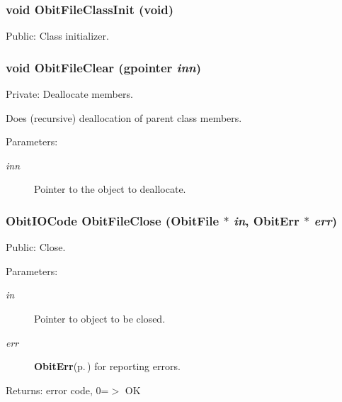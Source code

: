 \subsubsection{\setlength{\rightskip}{0pt plus 5cm}void Obit\-File\-Class\-Init (void)}\label{ObitFile_8c_a27}


Public: Class initializer. 

\subsubsection{\setlength{\rightskip}{0pt plus 5cm}void Obit\-File\-Clear (gpointer {\em inn})}\label{ObitFile_8c_a4}


Private: Deallocate members. 

Does (recursive) deallocation of parent class members. \begin{Desc}
\item[Parameters:]
\begin{description}
\item[{\em inn}]Pointer to the object to deallocate. \end{description}
\end{Desc}
\subsubsection{\setlength{\rightskip}{0pt plus 5cm}Obit\-IOCode Obit\-File\-Close ({\bf Obit\-File} $\ast$ {\em in}, {\bf Obit\-Err} $\ast$ {\em err})}\label{ObitFile_8c_a16}


Public: Close. 

\begin{Desc}
\item[Parameters:]
\begin{description}
\item[{\em in}]Pointer to object to be closed. \item[{\em err}]{\bf Obit\-Err}{\rm (p.\,\pageref{structObitErr})} for reporting errors. \end{description}
\end{Desc}
\begin{Desc}
\item[Returns:]error code, 0=$>$ OK \end{Desc}
